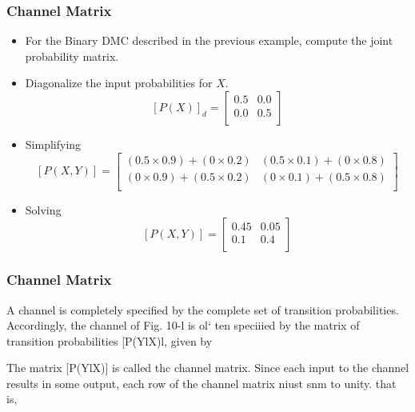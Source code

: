 \documentclass[a4]{beamer}
\begin{document}
\begin{frame}
\frametitle{Channel Matrix}
\begin{itemize}
\item For the Binary DMC described in the previous example, compute the joint probability matrix.
\item Diagonalize the input probabilities for $X$.
\[  [P(X)]_d  = \left[ \begin{array}{cc}
0.5 & 0.0  \\
0.0 & 0.5\\
\end{array} \right] \]

\item Simplifying
\[  [P(X,Y)]  =  \left[ \begin{array}{cc}
(0.5 \times 0.9)+(0 \times 0.2) & (0.5 \times 0.1)+(0 \times 0.8) \\
(0 \times 0.9)+(0.5 \times 0.2) & (0 \times 0.1)+(0.5 \times 0.8) \\
\end{array} \right]  \]


\item Solving
\[  [P(X,Y)]  =  \left[ \begin{array}{cc}
0.45 & 0.05 \\
0.1  & 0.4 \\
\end{array} \right]  \]
\end{itemize}
\end{frame}
\begin{frame}
\frametitle{ Channel Matrix}

A channel is completely specified by the complete set of transition probabilities. Accordingly, the
channel of Fig. 10-l is ol` ten speciiied by the matrix of transition probabilities [P(YlX)l, given by

The matrix [P(YlX)] is called thc channel matrix. Since each input to the channel results in some
output, each row of the channel matrix niust snm to unity. that is,
\end{frame}
\end{document}
